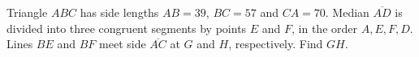 Triangle $ABC$ has side lengths $AB=39$, $BC=57$ and $CA=70$. Median $\overline{AD}$ is divided into three congruent segments by points $E$ and $F$, in the order $A,E,F,D$. Lines $BE$ and $BF$ meet side $\overline{AC}$ at $G$ and $H$, respectively. Find $GH$.
